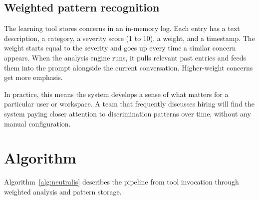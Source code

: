 \documentclass[conference]{IEEEtran}
\begin{document}
\subsection{Weighted pattern recognition}

The learning tool stores concerns in an in-memory log. Each entry has a text description, a category, a severity score (1 to 10), a weight, and a timestamp. The weight starts equal to the severity and goes up every time a similar concern appears. When the analysis engine runs, it pulls relevant past entries and feeds them into the prompt alongside the current conversation. Higher-weight concerns get more emphasis.

In practice, this means the system develops a sense of what matters for a particular user or workspace. A team that frequently discusses hiring will find the system paying closer attention to discrimination patterns over time, without any manual configuration.

\section{Algorithm}

Algorithm~\ref{alg:neutralis} describes the pipeline from tool invocation through weighted analysis and pattern storage.
\end{document}
